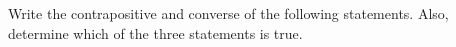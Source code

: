 \documentclass[../main.tex]{subfiles}
\begin{document}
\problem{}
Write the contrapositive and converse of the following statements. Also,
determine which of the three statements is true.



\end{document}
